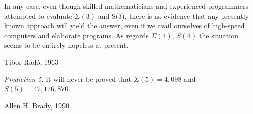 \documentclass[a4paper,british]{article}
\theoremstyle{definition} %
\numberwithin{equation}{section}
\theoremstyle{definition} %
\newcommand{\BBtheFifth}{47{,}176{,}870}
\newcommand{\SigmaTheFifth}{4{,}098}
\newcommand{\radofull}{Tibor Rad\'o\xspace}
\newcommand{\rado}{Rad\'o\xspace}
\begin{document}
\begin{center}

\end{center}
\vspace{-20pt}
\setlength{\epigraphwidth}{0.7\textwidth}
\epigraph{In any case, even though skilled mathematicians and experienced programmers attempted to evaluate $\Sigma(3)$ and S(3), there is no evidence that any presently known approach will yield the answer, even if we avail ourselves of high-speed computers and elaborate programs. As regards $\Sigma(4)$, $S(4)$ the situation seems to be entirely hopeless at present.}{\radofull, 1963 \cite{Rado_1963}}
\vspace{-1em}
\epigraph{\textit{Prediction 5}. It will never be proved that $\Sigma(5) = \SigmaTheFifth$ and $S(5) = \BBtheFifth$.}{Allen H. Brady, 1990 \cite{BradyMeaningOfLife}}
\vspace{2em}



\vspace{-30pt}
\end{document}
